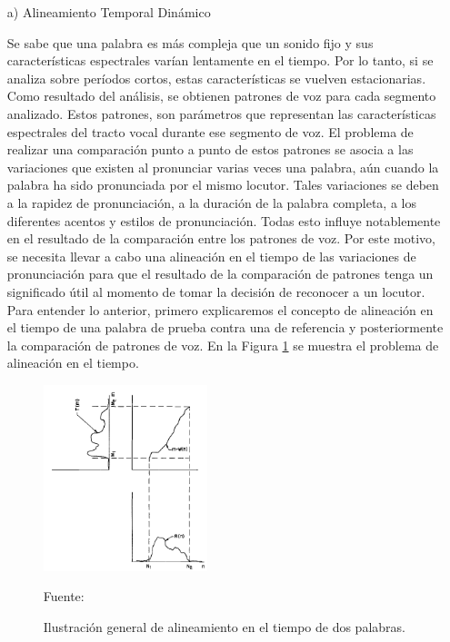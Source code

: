\begin{enumerate}
\item[a)]Alineamiento Temporal Dinámico
\par
Se sabe que una palabra es más compleja que un sonido fijo y sus características espectrales varían lentamente en el tiempo. Por lo tanto, si se analiza sobre períodos cortos, estas características se vuelven estacionarias. Como resultado del análisis, se obtienen patrones de voz para cada segmento analizado. Estos patrones, son parámetros que representan las características espectrales del tracto vocal durante ese segmento de voz. El problema de realizar una comparación punto a punto de estos patrones se asocia a las variaciones que existen al pronunciar varias veces una palabra, aún cuando la palabra ha sido pronunciada por el mismo locutor. 
\vskip 0.5cm
Tales variaciones se deben a la rapidez de pronunciación, a la duración de la palabra completa, a los diferentes acentos y estilos de pronunciación. Todas esto influye notablemente en el resultado de la comparación entre los patrones de voz. Por este motivo, se necesita llevar a cabo una alineación en el tiempo de las variaciones de pronunciación para que el resultado de la comparación de patrones tenga un significado útil al momento de tomar la decisión de reconocer a un locutor.
\vskip 0.5cm
Para entender lo anterior, primero explicaremos el concepto de alineación en el tiempo de una palabra de prueba contra una de referencia y posteriormente la comparación de patrones de voz. En la Figura \ref{fig:figura2.44} se muestra el problema de alineación en el tiempo.
\begin{figure}[H]
\begin{center}
\includegraphics[width=0.45\textwidth]{Imagenes/Cap2/image045}
\end{center}
\begin{center}
\vskip -0.5cm
\caption{\small{Ilustración general de alineamiento en el tiempo de dos palabras.}}
\label{fig:figura2.44}
{\small{Fuente: \cite{rabiner}}}
\end{center}
\end{figure}


\end{enumerate}
